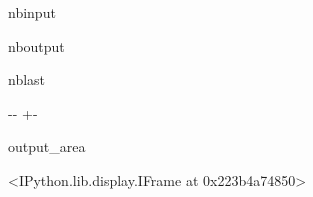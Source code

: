 \documentclass[letterpaper,10pt,english]{sphinxmanual}
\begin{document}
\begin{sphinxuseclass}{nbinput}
{
\begin{sphinxVerbatim}[commandchars=\\\{\}]
\llap{\color{nbsphinxin}[15]:\,\hspace{\fboxrule}\hspace{\fboxsep}}
                                    
\end{sphinxVerbatim}
}

\end{sphinxuseclass}
\begin{sphinxuseclass}{nboutput}
\begin{sphinxuseclass}{nblast}
{

\kern-\sphinxverbatimsmallskipamount\kern-\baselineskip
\kern+\FrameHeightAdjust\kern-\fboxrule
\vspace{\nbsphinxcodecellspacing}

\begin{sphinxuseclass}{output_area}
\begin{sphinxuseclass}{}


\begin{sphinxVerbatim}[commandchars=\\\{\}]
<IPython.lib.display.IFrame at 0x223b4a74850>
\end{sphinxVerbatim}



\end{sphinxuseclass}
\end{sphinxuseclass}
}

\end{sphinxuseclass}
\end{sphinxuseclass}
\end{document}
